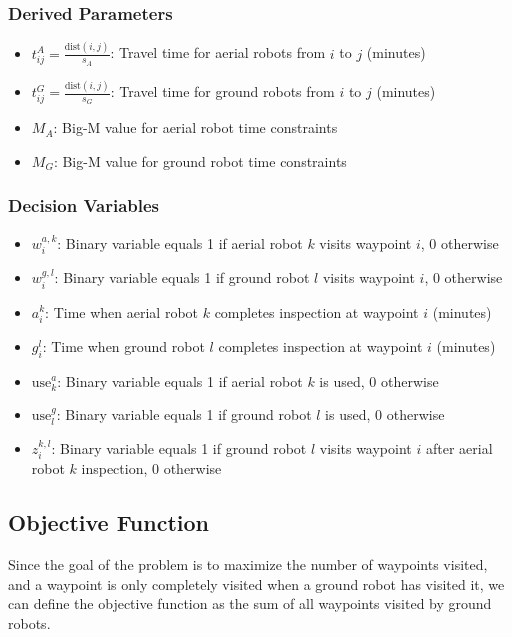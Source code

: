 \documentclass{article}
\begin{document}
			\subsubsection{Derived Parameters}

				\begin{itemize}
				\item $t_{ij}^{A} = \frac{\text{dist}(i,j)}{s_A}$: Travel time for aerial robots from $i$ to $j$ (minutes)
				\item $t_{ij}^{G} = \frac{\text{dist}(i,j)}{s_G}$: Travel time for ground robots from $i$ to $j$ (minutes)
				\item $M_A$: Big-M value for aerial robot time constraints
				\item $M_G$: Big-M value for ground robot time constraints
				\end{itemize}

			\subsubsection{Decision Variables}

				\begin{itemize}
				\item $w_i^{a,k}$: Binary variable equals 1 if aerial robot $k$ visits waypoint $i$, 0 otherwise
				\item $w_i^{g,l}$: Binary variable equals 1 if ground robot $l$ visits waypoint $i$, 0 otherwise
				\item $a_i^k$: Time when aerial robot $k$ completes inspection at waypoint $i$ (minutes)
				\item $g_i^l$: Time when ground robot $l$ completes inspection at waypoint $i$ (minutes)
				\item $\text{use}_k^a$: Binary variable equals 1 if aerial robot $k$ is used, 0 otherwise
				\item $\text{use}_l^g$: Binary variable equals 1 if ground robot $l$ is used, 0 otherwise
				\item $z_i^{k,l}$: Binary variable equals 1 if ground robot $l$ visits waypoint $i$ after aerial robot $k$ inspection, 0 otherwise
				\end{itemize}


		\subsection{Objective Function}

			Since the goal of the problem is to maximize the number of waypoints visited, and a waypoint is only completely visited when a ground robot has visited it, we can define the objective function as the sum of all waypoints visited by ground robots.
\end{document}
